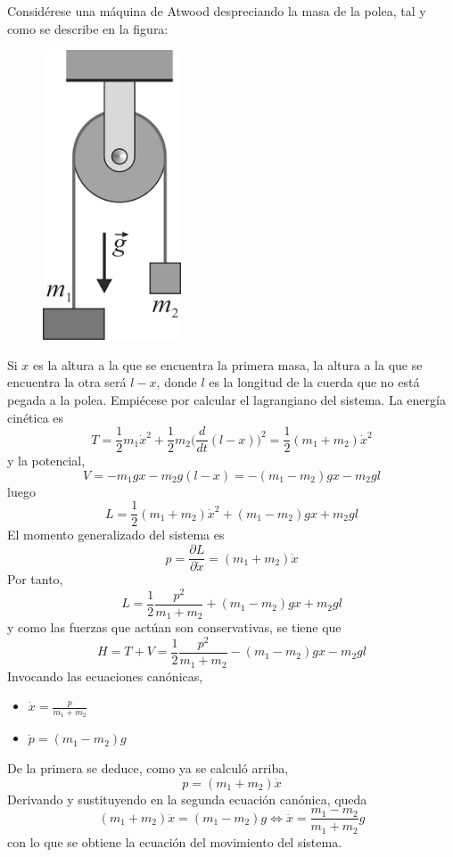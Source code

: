 \documentclass[12pt]{report}
\begin{document}
\begin{example}
Considérese una máquina de Atwood despreciando la masa de la polea, tal y como se describe en la figura:

\begin{figure}[h]
\includegraphics[scale = 0.4]{3.1_1}
\centering
\end{figure}

\noindent Si $x$ es la altura a la que se encuentra la primera masa, la altura a la que se encuentra la otra será $l-x$, donde $l$ es la longitud de la cuerda que no está pegada a la polea. Empiécese por calcular el lagrangiano del sistema. La energía cinética es
\[T = \frac{1}{2}m_1\dot{x}^2+\frac{1}{2}m_2\biggl(\frac{d}{dt}(l-x)\biggr)^2 = \frac{1}{2}(m_1+m_2)\dot{x}^2\]
y la potencial,
\[ V = -m_1gx-m_2g(l-x) = -(m_1-m_2)gx - m_2gl\]
luego
\[L = \frac{1}{2}(m_1+m_2)\dot{x}^2+(m_1-m_2)gx + m_2gl\]
El momento generalizado del sistema es
\[p = \frac{\partial L}{\partial \dot{x}} = (m_1+m_2)\dot{x}\]
Por tanto,
\[L = \frac{1}{2}\frac{p^2}{m_1+m_2} +(m_1-m_2)gx + m_2gl\]
y como las fuerzas que actúan son conservativas, se tiene que
\[H = T + V = \frac{1}{2}\frac{p^2}{m_1+m_2} -(m_1-m_2)gx - m_2gl\]
Invocando las ecuaciones canónicas,
\begin{itemize}
    \item $\displaystyle \dot{x} = \frac{p}{m_1+m_2}$
    \item $\displaystyle \dot{p} = (m_1-m_2)g \qquad$
\end{itemize}
De la primera se deduce, como ya se calculó arriba,
\[p = (m_1+m_2)\dot{x}\]
Derivando y sustituyendo en la segunda ecuación canónica, queda
\[(m_1+m_2)\ddot{x} = (m_1-m_2)g \iff \ddot{x} = \frac{m_1-m_2}{m_1+m_2}g\]
con lo que se obtiene la ecuación del movimiento del sistema.
\end{example}
\end{document}
